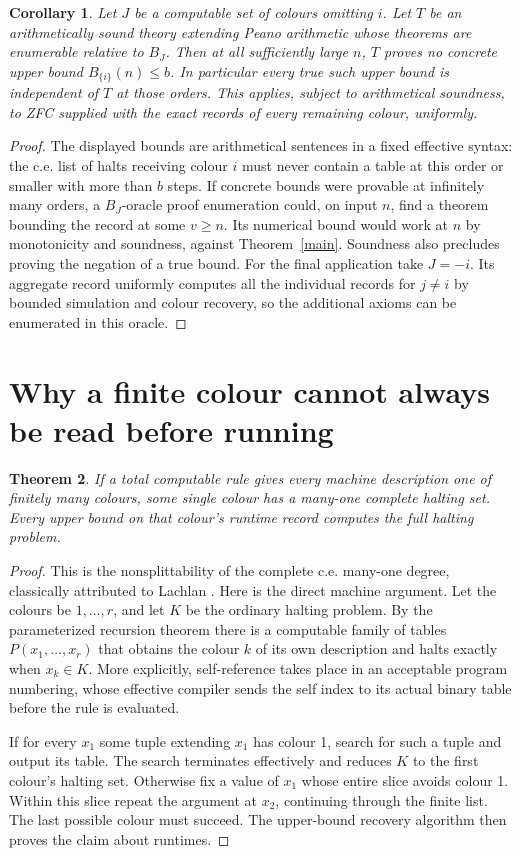 \documentclass[11pt]{article}
\newtheorem{theorem}{Theorem}
\newtheorem{corollary}[theorem]{Corollary}
\begin{document}
\begin{corollary}\label{theories}
Let $J$ be a computable set of colours omitting $i$. Let $T$ be an arithmetically sound theory extending Peano arithmetic whose theorems are enumerable relative to $B_J$. Then at all sufficiently large $n$, $T$ proves no concrete upper bound $B_{\{i\}}(n)\le b$. In particular every true such upper bound is independent of $T$ at those orders. This applies, subject to arithmetical soundness, to ZFC supplied with the exact records of every remaining colour, uniformly.
\end{corollary}
\begin{proof}
The displayed bounds are arithmetical sentences in a fixed effective syntax: the c.e. list of halts receiving colour $i$ must never contain a table at this order or smaller with more than $b$ steps. If concrete bounds were provable at infinitely many orders, a $B_J$-oracle proof enumeration could, on input $n$, find a theorem bounding the record at some $v\ge n$. Its numerical bound would work at $n$ by monotonicity and soundness, against Theorem~\ref{main}. Soundness also precludes proving the negation of a true bound. For the final application take $J=-i$. Its aggregate record uniformly computes all the individual records for $j\ne i$ by bounded simulation and colour recovery, so the additional axioms can be enumerated in this oracle.
\end{proof}

\section{Why a finite colour cannot always be read before running}
\begin{theorem}
If a total computable rule gives every machine description one of finitely many colours, some single colour has a many-one complete halting set. Every upper bound on that colour's runtime record computes the full halting problem.
\end{theorem}
\begin{proof}
This is the nonsplittability of the complete c.e. many-one degree, classically attributed to Lachlan \cite{lachlan}. Here is the direct machine argument. Let the colours be $1,\ldots,r$, and let $K$ be the ordinary halting problem. By the parameterized recursion theorem there is a computable family of tables $P(x_1,\ldots,x_r)$ that obtains the colour $k$ of its own description and halts exactly when $x_k\in K$. More explicitly, self-reference takes place in an acceptable program numbering, whose effective compiler sends the self index to its actual binary table before the rule is evaluated.

If for every $x_1$ some tuple extending $x_1$ has colour 1, search for such a tuple and output its table. The search terminates effectively and reduces $K$ to the first colour's halting set. Otherwise fix a value of $x_1$ whose entire slice avoids colour 1. Within this slice repeat the argument at $x_2$, continuing through the finite list. The last possible colour must succeed. The upper-bound recovery algorithm then proves the claim about runtimes.
\end{proof}
\end{document}
